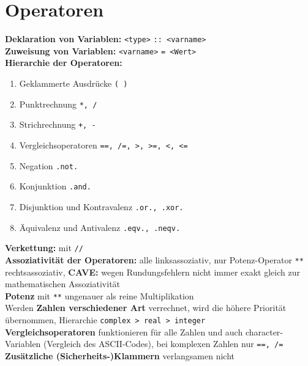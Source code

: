 \documentclass[a4paper, twocolumn]{scrarticle}
\begin{document}
\section{Operatoren}
\textbf{Deklaration von Variablen:} \lstinline|<type>| \lstinline|:: <varname>|\\
\textbf{Zuweisung von Variablen:} \lstinline|<varname>| \lstinline|= <Wert>|\\
\textbf{Hierarchie der Operatoren:}
\begin{enumerate}
  \item Geklammerte Ausdrücke \lstinline|( )|
  \item Punktrechnung \lstinline|*, /|
  \item Strichrechnung \lstinline|+, -|
  \item Vergleichsoperatoren \lstinline[style=neutral]|==, /=, >, >=, <, <=|
  \item Negation \lstinline|.not.|
  \item Konjunktion \lstinline|.and.|
  \item Disjunktion und Kontravalenz \lstinline|.or., .xor.|
  \item Äquivalenz und Antivalenz \lstinline|.eqv., .neqv.|
\end{enumerate}
\textbf{Verkettung:} mit \lstinline|//|\\
\textbf{Assoziativität der Operatoren:} alle linksassoziativ, nur Potenz-Operator \lstinline|**| rechtsassoziativ, \textbf{CAVE:} wegen Rundungsfehlern nicht immer exakt gleich zur mathematischen Assoziativität\\
\textbf{Potenz} mit \lstinline|**| ungenauer als reine Multiplikation\\
Werden \textbf{Zahlen verschiedener Art} verrechnet, wird die höhere Priorität übernommen, Hierarchie \lstinline|complex > real > integer|\\
\textbf{Vergleichsoperatoren} funktionieren für alle Zahlen und auch character-Variablen (Vergleich des ASCII-Codes), bei komplexen Zahlen nur \lstinline|==, /=|\\
\textbf{Zusätzliche (Sicherheits-)Klammern} verlangsamen nicht
\end{document}
